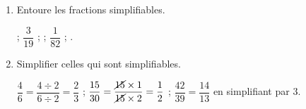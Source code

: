     \begin{enumerate}
        \item Entoure les fractions simplifiables.

        \smallskip
         ; $\dfrac{3}{19}$ ;  ; $\dfrac{1}{82}$ ; .
        \smallskip

        \item Simplifier celles qui sont simplifiables.

        $\dfrac{4}{6}=\dfrac{4\div 2}{6\div 2}=\dfrac{2}{3}$ ; $\dfrac{15}{30}=\dfrac{\cancel{15}\times 1}{\cancel{15}\times 2}=\dfrac{1}{2}$ ;
        $\dfrac{42}{39}=\dfrac{14}{13}$ en simplifiant par $3$.
    \end{enumerate}
